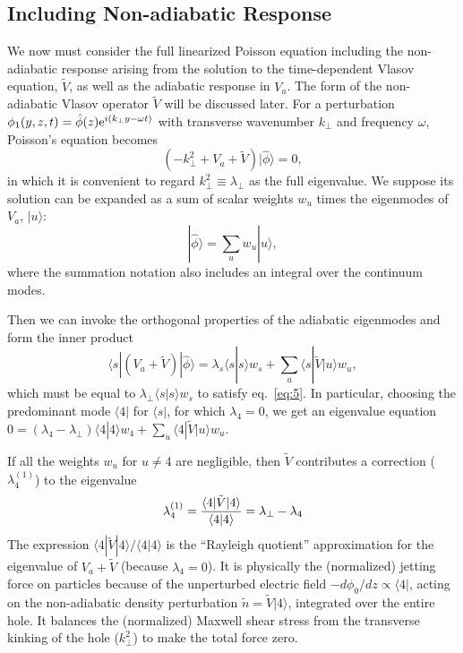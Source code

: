 \documentclass[12pt]{article}
\def\ket#1{|#1\rangle}
\def\bra#1{\langle#1}
\begin{document}
\subsection{Including Non-adiabatic Response}
We now must consider the full linearized Poisson equation including the
non-adiabatic response arising from the solution to the time-dependent
Vlasov equation, $\tilde{V}$, as well as the adiabatic response
in $V_a$. The form of the non-adiabatic Vlasov operator $\tilde{V}$ will
be discussed later. For a perturbation
$\phi_1(y,z,t)=\hat\phi(z){\rm e}^{i(k_\perp y-\omega t)}$ with
transverse wavenumber $k_\perp$ and frequency $\omega$, Poisson's
equation becomes
\begin{equation}
  \label{eq:5}
  (-k_\perp^2+V_a+\tilde{V})\ket{\hat\phi}=0,
\end{equation}
in which it is convenient to regard $k_\perp^2\equiv\lambda_\perp$ as the
full eigenvalue. 
We suppose its solution can be expanded as a sum of scalar
weights $w_u$ times the eigenmodes of $V_a$, $\ket{u}$:
\begin{equation}
  \label{eq:6}
  \ket{\hat\phi}=\sum_u w_u \ket{u},
\end{equation}
where the summation notation also includes an integral over the
continuum modes.

Then we can invoke the orthogonal properties of the
adiabatic eigenmodes and form the inner product
\begin{equation}
  \label{eq:7}
  \bra{s}|(%
  V_a+\tilde{V})\ket{\hat\phi}
  = %
  \lambda_s\bra{s}\ket{s}w_s+\sum_u\bra{s}|\tilde{V}\ket{u}w_u,
\end{equation}
which must be equal to $\lambda_\perp\bra{s}\ket{s}w_s$ to satisfy eq.\ \ref{eq:5}.
In particular, choosing the predominant mode $\bra{4}|$ for
$\bra{s}|$, for which $\lambda_4=0$, we get an eigenvalue equation
$0=(\lambda_4-\lambda_\perp)\bra{4}\ket{4}w_4+\sum_u\bra{4}|\tilde{V}\ket{u}w_u$.

If all the weights $w_u$ for $u\not=4$ are negligible, then
$\tilde{V}$ contributes a correction ($\lambda_{4}^{(1)}$) to the eigenvalue
\begin{equation}
  \label{eq:8}
  \lambda_{4}^{(1)}= {\bra{4}|\tilde{V}\ket{4}\over\bra{4}\ket{4}}=\lambda_\perp-\lambda_4
\end{equation}
The expression $\bra{4}|\tilde{V}\ket{4}/\bra{4}\ket{4}$ is the ``Rayleigh
quotient'' approximation for the eigenvalue of $V_a+\tilde{V}$
(because $\lambda_4=0$). It is
physically the (normalized) jetting force on particles because of the
unperturbed electric field $-d\phi_0/dz\propto\bra{4}|$, acting on the
non-adiabatic density perturbation $\tilde n = \tilde{V}\ket{4}$, integrated
over the entire hole. It balances the (normalized) Maxwell shear
stress from the transverse kinking of the hole ($k_\perp^2$) to
make the total force zero.
\end{document}
